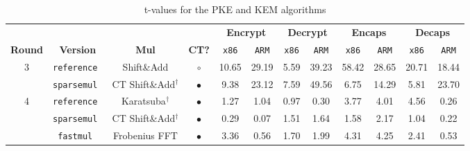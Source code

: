 \begin{table}[H]\footnotesize
    \centering
    \caption{t-values for the PKE and KEM algorithms}
    \begin{tabular}{c | c c c | c c | c c | c c | c c }
        \toprule
        & & & &  \multicolumn{2}{c|}{\textbf{Encrypt}} & \multicolumn{2}{c|}{\textbf{Decrypt}} &  \multicolumn{2}{c|}{\textbf{Encaps}} & \multicolumn{2}{c}{\textbf{Decaps}}\\
        \textbf{Round} & \textbf{Version} & \textbf{Mul} & \textbf{CT?} & \texttt{x86} & \texttt{ARM} & \texttt{x86} & \texttt{ARM} & \texttt{x86} & \texttt{ARM} & \texttt{x86} & \texttt{ARM} \\
        \midrule
        \multirow{2}{*}{3}
        & \tt{reference} & Shift\&Add & $\circ$ & 10.65 & 29.19 & 5.59 & 39.23 & 58.42 & 28.65 & 20.71 & 18.44\\
        & \tt{sparsemul} & CT Shift\&Add$^\dagger$ & $\bullet$ & 9.38 & 23.12 & 7.59 & 49.56 & 6.75 & 14.29 & 5.81 & 23.70 \\
        \midrule
        \multirow{3}{*}{4}
        & \tt{reference} & Karatsuba$^\dagger$ & $\bullet$ & 1.27 & 1.04 & 0.97 & 0.30 & 3.77 & 4.01 & 4.56 & 0.26\\
        & \tt{sparsemul} & CT Shift\&Add$^\dagger$ & $\bullet$ & 0.29 & 0.07 & 1.51 & 1.64 & 1.58 & 2.17 & 1.04 & 0.22 \\
        & \tt{fastmul} & Frobenius FFT & $\bullet$ & 3.36 & 0.56 & 1.70 & 1.99 & 4.31 & 4.25 & 2.41 & 0.53 \\
        \bottomrule
    \end{tabular}
    \label{tab:ct}
\end{table}




